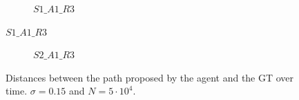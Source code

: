 \begin{figure}[H]
     \centering
     \begin{subfigure}[b]{0.9\textwidth}
         \centering
         
         \caption{$S1\_A1\_R3$}
     \end{subfigure}
\end{figure}
\begin{figure}[H]\ContinuedFloat
     \begin{subfigure}[b]{0.9\textwidth}
         \centering
         
         \caption{$S2\_A1\_R3$}
     \end{subfigure}
        \caption{Distances between the path proposed by the agent and the GT over time. $\sigma = 0.15$ and $N=5\cdot 10^4$.}
        \label{fig:advCurves1}
\end{figure}


